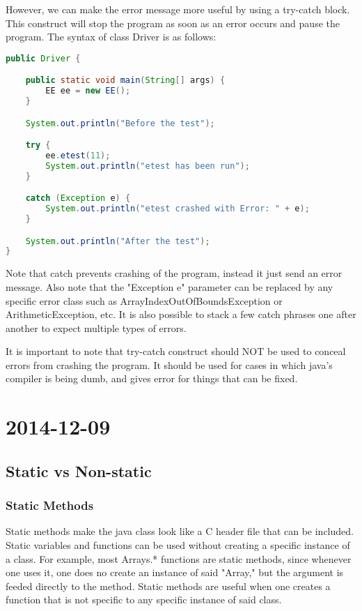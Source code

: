 \documentclass [12 pt, twoside] {article}
\begin{document}
However, we can make the error message more useful by using a try-catch block. This
construct will stop the program as soon as an error occurs and pause the program. The
syntax of class Driver is as follows:


\begin{lstlisting}[language=java]
public Driver {

	public static void main(String[] args) {
		EE ee = new EE();
	}

	System.out.println("Before the test");

	try {
		ee.etest(11);
		System.out.println("etest has been run");
	}

	catch (Exception e) {
		System.out.println("etest crashed with Error: " + e);
	}

	System.out.println("After the test");
}
\end{lstlisting}

Note that catch prevents crashing of the program, instead it just send an
error message. Also note that the "Exception e" parameter can be replaced
by any specific error class such as ArrayIndexOutOfBoundsException or 
ArithmeticException, etc. It is also possible to stack a few catch phrases
one after another to expect multiple types of errors.


It is important to note that try-catch construct should NOT be used to conceal
errors from crashing the program. It should be used for cases in which java's
compiler is being dumb, and gives error for things that can be fixed.


\section{2014-12-09}

\subsection{Static vs Non-static}

\subsubsection{Static Methods}

Static methods make the java class look like a C header file that can be included.
Static variables and functions can be used without creating a specific instance of a class.
For example, most Arrays.* functions are static methods, since whenever one
uses it, one does no create an instance of said "Array," but the argument is feeded
directly to the method. Static methods are useful when one creates a function
that is not specific to any specific instance of said class.
\end{document}
